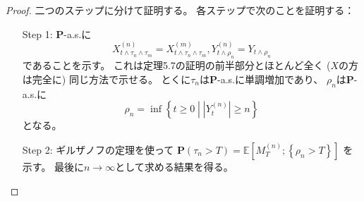 \documentclass[uplatex]{jsarticle}
\theoremstyle{definition}
\def\P{\mathbf{P}}
\def\E{\mathbb{E}}
\begin{document}
\begin{proof}
  二つのステップに分けて証明する。
  各ステップで次のことを証明する：
  \begin{itemize}
    \item[Step 1:]
    \(\P\)-a.s.に
    \[
    X_{t\wedge \tau_n \wedge \tau_m}^{(n)}
    = X_{t\wedge \tau_n \wedge \tau_m}^{(m)},
    Y_{t\wedge \rho_n}^{(n)}
    = Y_{t\wedge \rho_n}
    \]
    であることを示す。
    これは定理5.7の証明の前半部分とほとんど全く
    (\(X\)の方は完全に) 同じ方法で示せる。
    とくに\(\tau_n\)は\(\P\)-a.s.に単調増加であり、
    \(\rho_n\)は\(\P\)-a.s.に
    \[
    \rho_n = \inf\left\{ t \geq 0 \middle| |Y_t^{(n)}| \geq n\right\}
    \]
    となる。
    \item[Step 2:]
    ギルザノフの定理を使って
    \(\P(\tau_n > T) = \E \left[ M_T^{(n)}; \left\{ \rho_n > T \right\} \right]\)
    を示す。
    最後に\(n\to \infty\)として求める結果を得る。
  \end{itemize}


\end{proof}
\end{document}

